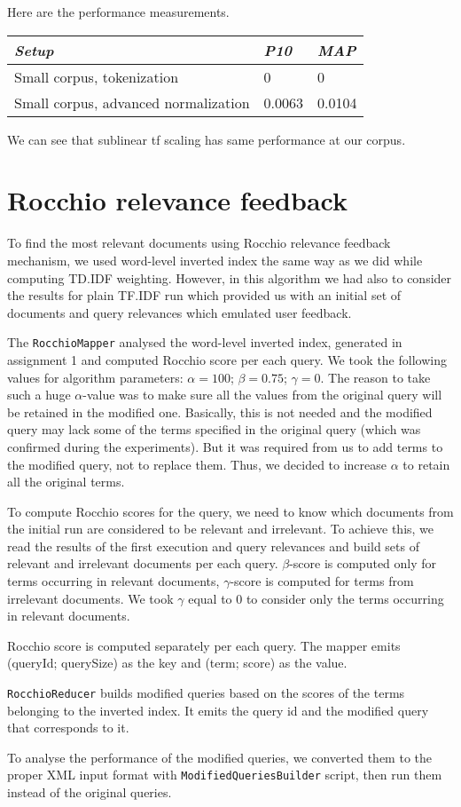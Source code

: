 \documentclass[a4paper, notitlepage]{article}
\begin{document}
Here are the performance measurements.

\begin{center}
	\begin{tabular}{ | l | l | l |}\hline \emph{Setup} & \emph{P10} & \emph{MAP}\\ \hline
    Small corpus, tokenization & 0 & 0 \\ \hline
    Small corpus, advanced normalization & 0.0063 & 0.0104 \\ \hline
    \end{tabular}
\end{center}

We can see that sublinear tf scaling has same performance at our corpus.

\section{Rocchio relevance feedback}

To find the most relevant documents using Rocchio relevance feedback mechanism, we used word-level inverted index the same way as we did while computing TD.IDF weighting. However, in this algorithm we had also to consider the results for plain TF.IDF run which provided us with an initial set of documents and query relevances which emulated user feedback.

The \lstinline{RocchioMapper} analysed the word-level inverted index, generated in assignment 1 and computed Rocchio score per each query. We took the following values for algorithm parameters: $\alpha=100$; $\beta=0.75$; $\gamma=0$. The reason to take such a huge $\alpha$-value was to make sure all the values from the original query will be retained in the modified one. Basically, this is not needed and the modified query may lack some of the terms specified in the original query (which was confirmed during the experiments). But it was required from us to add terms to the modified query, not to replace them. Thus, we decided to increase $\alpha$ to retain all the original terms.

To compute Rocchio scores for the query, we need to know which documents from the initial run are considered to be relevant and irrelevant. To achieve this, we read the results of the first execution and query relevances and build sets of relevant and irrelevant documents per each query. $\beta$-score is computed only for terms occurring in relevant documents, $\gamma$-score is computed for terms from irrelevant documents. We took $\gamma$ equal to 0 to consider only the terms occurring in relevant documents.

Rocchio score is computed separately per each query. The mapper emits (queryId; querySize) as the key and (term; score) as the value.

\lstinline{RocchioReducer} builds modified queries based on the scores of the terms belonging to the inverted index. It emits the query id and the modified query that corresponds to it.

To analyse the performance of the modified queries, we converted them to the proper XML input format with \lstinline{ModifiedQueriesBuilder} script, then run them instead of the original queries.
\end{document}
